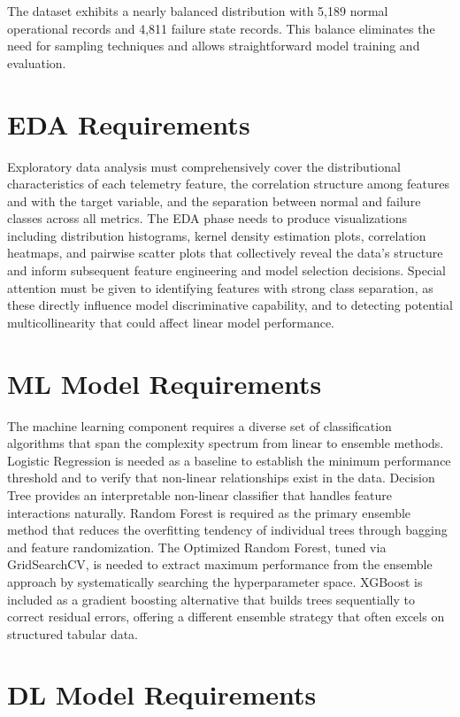 \documentclass[12pt,letterpaper]{report}
\begin{document}
The dataset exhibits a nearly balanced distribution with 5,189 normal operational records and 4,811 failure state records. This balance eliminates the need for sampling techniques and allows straightforward model training and evaluation.

\section{EDA Requirements}

Exploratory data analysis must comprehensively cover the distributional characteristics of each telemetry feature, the correlation structure among features and with the target variable, and the separation between normal and failure classes across all metrics. The EDA phase needs to produce visualizations including distribution histograms, kernel density estimation plots, correlation heatmaps, and pairwise scatter plots that collectively reveal the data's structure and inform subsequent feature engineering and model selection decisions. Special attention must be given to identifying features with strong class separation, as these directly influence model discriminative capability, and to detecting potential multicollinearity that could affect linear model performance.

\section{ML Model Requirements}

The machine learning component requires a diverse set of classification algorithms that span the complexity spectrum from linear to ensemble methods. Logistic Regression is needed as a baseline to establish the minimum performance threshold and to verify that non-linear relationships exist in the data. Decision Tree provides an interpretable non-linear classifier that handles feature interactions naturally. Random Forest is required as the primary ensemble method that reduces the overfitting tendency of individual trees through bagging and feature randomization. The Optimized Random Forest, tuned via GridSearchCV, is needed to extract maximum performance from the ensemble approach by systematically searching the hyperparameter space. XGBoost is included as a gradient boosting alternative that builds trees sequentially to correct residual errors, offering a different ensemble strategy that often excels on structured tabular data.

\section{DL Model Requirements}
\end{document}
